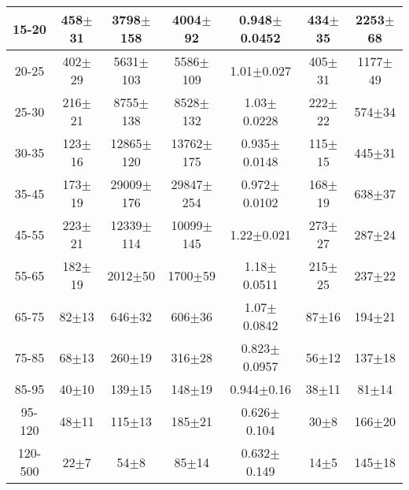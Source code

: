 \begin{table}[h]
\begin{center}
\begin{tabular}{|c|c|c|c|c|c|c|}
15-20 & 458$\pm$31 & 3798$\pm$158 & 4004$\pm$92 & 0.948$\pm$0.0452& 434$\pm$35& 2253$\pm$68 \\ \hline
20-25 & 402$\pm$29 & 5631$\pm$103 & 5586$\pm$109 & 1.01$\pm$0.027& 405$\pm$31& 1177$\pm$49 \\ \hline
25-30 & 216$\pm$21 & 8755$\pm$138 & 8528$\pm$132 & 1.03$\pm$0.0228& 222$\pm$22& 574$\pm$34 \\ \hline
30-35 & 123$\pm$16 & 12865$\pm$120 & 13762$\pm$175 & 0.935$\pm$0.0148& 115$\pm$15& 445$\pm$31 \\ \hline
35-45 & 173$\pm$19 & 29009$\pm$176 & 29847$\pm$254 & 0.972$\pm$0.0102& 168$\pm$19& 638$\pm$37 \\ \hline
45-55 & 223$\pm$21 & 12339$\pm$114 & 10099$\pm$145 & 1.22$\pm$0.021& 273$\pm$27& 287$\pm$24 \\ \hline
55-65 & 182$\pm$19 & 2012$\pm$50 & 1700$\pm$59 & 1.18$\pm$0.0511& 215$\pm$25& 237$\pm$22 \\ \hline
65-75 & 82$\pm$13 & 646$\pm$32 & 606$\pm$36 & 1.07$\pm$0.0842& 87$\pm$16& 194$\pm$21 \\ \hline
75-85 & 68$\pm$13 & 260$\pm$19 & 316$\pm$28 & 0.823$\pm$0.0957& 56$\pm$12& 137$\pm$18 \\ \hline
85-95 & 40$\pm$10 & 139$\pm$15 & 148$\pm$19 & 0.944$\pm$0.16& 38$\pm$11& 81$\pm$14 \\ \hline
95-120 & 48$\pm$11 & 115$\pm$13 & 185$\pm$21 & 0.626$\pm$0.104& 30$\pm$8& 166$\pm$20 \\ \hline
120-500 & 22$\pm$7 & 54$\pm$8 & 85$\pm$14 & 0.632$\pm$0.149& 14$\pm$5& 145$\pm$18 \\ \hline
  \end{tabular}
  \label{tab:EtoGAMMA_NoWMtCut_1}
  \end{center}
\end{table}
